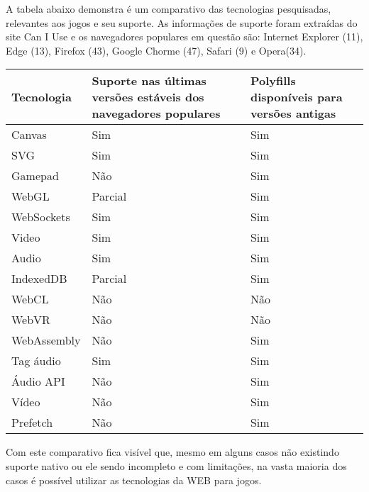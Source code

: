 A tabela abaixo demonstra é um comparativo das tecnologias pesquisadas,
relevantes aos jogos e seu suporte. As informações de suporte foram
extraídas do site Can I Use e os navegadores populares em questão
são: Internet Explorer (11), Edge (13), Firefox (43), Google Chorme
(47), Safari (9) e Opera(34).

\begin{tabular}{ |p{3cm}|p{3cm}|p{3cm}|  }
\hline
Tecnologia & Suporte nas últimas versões estáveis dos navegadores populares & Polyfills disponíveis  para versões antigas \\
\hline
Canvas & Sim & Sim \\
SVG & Sim & Sim \\
Gamepad & Não & Sim \\
WebGL & Parcial & Sim \\
WebSockets & Sim & Sim \\
Video & Sim & Sim \\
Audio & Sim & Sim \\
IndexedDB & Parcial & Sim \\
WebCL & Não & Não \\
WebVR & Não & Não \\
WebAssembly & Não & Sim \\
Tag áudio & Sim & Sim \\
Áudio API & Não & Sim \\
Vídeo & Não & Sim \\
Prefetch & Não & Sim \\
\hline
\end{tabular}

Com este comparativo fica visível que, mesmo em alguns casos não
existindo suporte nativo ou ele sendo incompleto e com limitações, na
vasta maioria dos casos é possível utilizar as tecnologias da WEB para
jogos.


